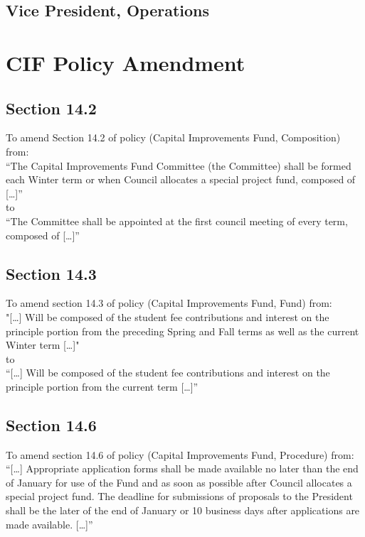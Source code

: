 \documentclass[12pt, letterpaper]{article}
\begin{document}
\subsection*{Vice President, Operations}


\newpage
{}
\section*{CIF Policy Amendment}

\subsection*{Section 14.2}
To amend Section 14.2 of policy (Capital Improvements Fund, Composition) from:\\

“The Capital Improvements Fund Committee (the Committee) shall be formed each Winter term or when Council allocates a special project fund, composed of […]”\\

to\\

“The Committee shall be appointed at the first council meeting of every term, composed of […]”

\subsection*{Section 14.3}
To amend section 14.3 of policy (Capital Improvements Fund, Fund) from:\\

"[…] Will be composed of the student fee contributions and interest on the principle portion from the preceding Spring and Fall terms as well as the current Winter term […]"\\

to\\

“[…] Will be composed of the student fee contributions and interest on the principle portion from the current term […]”

\subsection*{Section 14.6}
To amend section 14.6 of policy (Capital Improvements Fund, Procedure) from:\\

“[…] Appropriate application forms shall be made available no later than the end of January for use of the Fund and as soon as possible after Council allocates a special project fund. The deadline for submissions of proposals to the President shall be the later of the end of January or 10 business days after applications are made available. […]”\\
\end{document}
